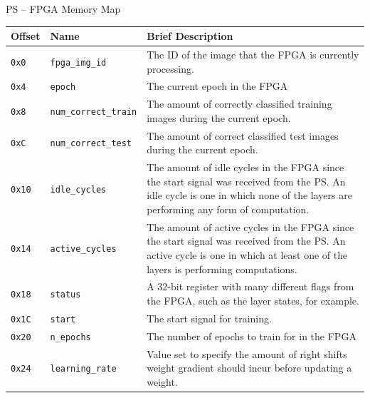 \begin{table}
	\centering
	\Large PS -- FPGA Memory Map \\\vspace{0.5em}
	\normalsize
	\begin{tabularx}{\textwidth}{|l| l| X|}
		\hline
		\textbf{Offset}	& \textbf{Name} & \textbf{Brief Description}\\\hline
		
		\texttt{0x0}	& 
		\texttt{fpga\_img\_id} & 
		The ID of the image that the FPGA is currently processing. \\\hline
		
		\texttt{0x4} &
		\texttt{epoch} &
		The current epoch in the FPGA \\\hline
		
		\texttt{0x8} &
		\texttt{num\_correct\_train} &
		The amount of correctly classified training images during the current epoch. \\\hline 
		
		\texttt{0xC} &
		\texttt{num\_correct\_test} &
		The amount of correct classified test images during the current epoch. \\\hline
		
		\texttt{0x10} &
		\texttt{idle\_cycles} &
		The amount of idle cycles in the FPGA since the start signal was received from the PS. An idle cycle is one in which none of the layers are performing any form of computation. \\\hline
		
		\texttt{0x14} &
		\texttt{active\_cycles} &
		The amount of active cycles in the FPGA since the start signal was received from the PS. An active cycle is one in which at least one of the layers is performing computations. \\\hline
		
		\texttt{0x18} &
		\texttt{status} &
		A 32-bit register with many different flags from the FPGA, such as the layer states, for example. \\\hline 
		
		\texttt{0x1C} &
		\texttt{start} &
		The start signal for training. \\\hline 
		
		\texttt{0x20} &
		\texttt{n\_epochs} &
		The number of epochs to train for in the FPGA \\\hline 
		
		\texttt{0x24} &
		\texttt{learning\_rate} &
		Value set to specify the amount of right shifts weight gradient should incur before updating a weight. \\\hline 
		

\end{tabularx}
\end{table}

